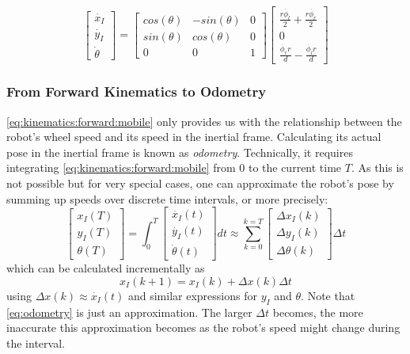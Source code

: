 \begin{equation}\label{eq:kinematics:forward:mobile}
\left[\begin{array}{c} \dot{x_I}\\\dot{y_I}\\\dot{\theta}\end{array}\right]=\left[\begin{array}{ccc}
cos(\theta) & -sin(\theta) & 0 \\
sin(\theta) & cos(\theta) & 0 \\
0 & 0 & 1\end{array}\right]\left[\begin{array}{c}\frac{r\dot{\phi_l}}{2}+\frac{r\dot{\phi_r}}{2}\\0\\\frac{\dot{\phi_r} r}{d}-\frac{\dot{\phi_l} r}{d}\end{array}\right]
\end{equation}

\subsubsection{From Forward Kinematics to Odometry}

\cref{eq:kinematics:forward:mobile} only provides us with the relationship between the robot's wheel speed and its speed in the inertial frame.
Calculating its actual pose in the inertial frame is known as \emph{odometry}. Technically, it requires integrating \cref{eq:kinematics:forward:mobile} from 0 to the current time $T$.
As this is not possible but for very special cases, one can approximate the robot's pose by summing up speeds over discrete time intervals, or more precisely:
\begin{equation}
\left[\begin{array}{c} {x_I}(T)\\{y_I}(T)\\{\theta}(T)\end{array}\right]=
\int_0^T \left[\begin{array}{c} \dot{x_I}(t)\\\dot{y_I}(t)\\\dot{\theta}(t)\end{array}\right] dt \approx
\sum_{k=0}^{k=T}\left[\begin{array}{c} \Delta{x_I}(k)\\\Delta{y_I}(k)\\\Delta{\theta}(k)\end{array}\right]\Delta t
\end{equation} which can be calculated incrementally as
\begin{equation}\label{eq:odometry}
x_I(k+1)=x_I(k)+\Delta x (k) \Delta t
\end{equation}
using $\Delta x(k) \approx \dot{x_I}(t)$ and similar expressions for $y_I$ and $\theta$. Note that \cref{eq:odometry} is just an approximation. The larger $\Delta t$ becomes, the more inaccurate this approximation becomes as the robot's speed might change during the interval.

